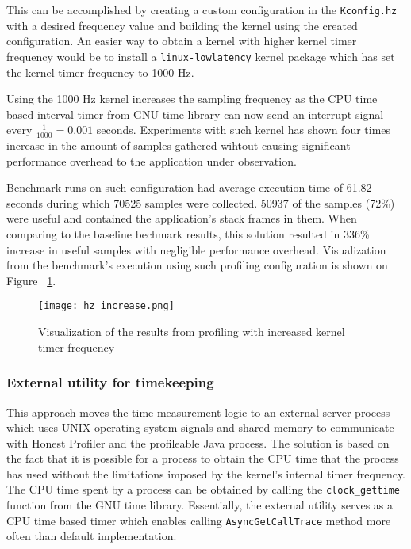 \documentclass[..thesis.tex]{subfiles}
\begin{document}
This can be accomplished by creating a custom configuration in the \texttt{Kconfig.hz} with a desired frequency value and building the kernel using the created configuration. An easier way to obtain a kernel with higher kernel timer frequency would be to install a \texttt{linux-lowlatency} kernel package which has set the kernel timer frequency to 1000 Hz.

Using the 1000 Hz kernel increases the sampling frequency as the CPU time based interval timer from GNU time library can now send an interrupt signal every $\frac{1}{1000} = 0.001$ seconds. Experiments with such kernel has shown four times increase in the amount of samples gathered wihtout causing significant performance overhead to the application under observation.

Benchmark runs on such configuration had average execution time of 61.82 seconds during which 70525 samples were collected. 50937 of the samples (72\%) were useful and contained the application's stack frames in them. When comparing to the baseline bechmark results, this solution resulted in 336\% increase in useful samples with negligible performance overhead. Visualization from the benchmark's execution using such profiling configuration is shown on Figure ~\ref{fig:hz_increase}.
\begin{figure}[H]
\texttt{[image: hz\_increase.png]}
\caption{Visualization of the results from profiling with increased kernel timer frequency}
\label{fig:hz_increase}
\end{figure}

\subsubsection{External utility for timekeeping}
\label{shared-mem}

This approach moves the time measurement logic to an external server process which uses UNIX operating system signals and shared memory to communicate with Honest Profiler and the profileable Java process. The solution is based on the fact that it is possible for a process to obtain the CPU time that the process has used without the limitations imposed by the kernel's internal timer frequency. The CPU time spent by a process can be obtained by calling the \texttt{clock\_\-gettime} function from the GNU time library. Essentially, the external utility serves as a CPU time based timer which enables calling \texttt{Async\-Get\-Call\-Trace} method more often than default implementation.
\end{document}
